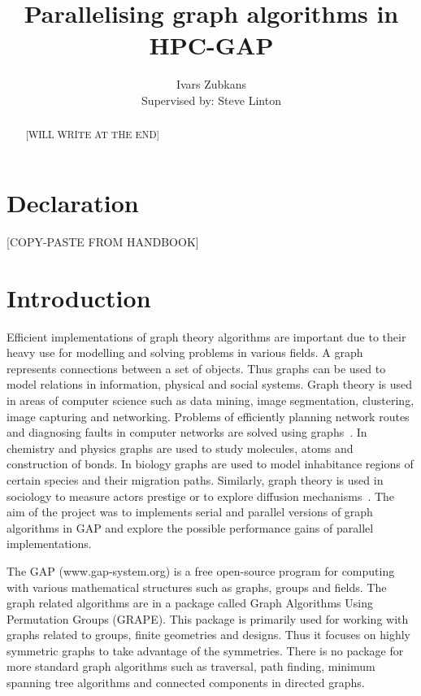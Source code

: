 \documentclass{report}
\title{Parallelising graph algorithms in HPC-GAP}
\author{Ivars Zubkans \\ \small Supervised by: Steve Linton}
\theoremstyle{plain}
\theoremstyle{definition}
\theoremstyle{remark}
\begin{document}
\maketitle

\begin{abstract}
[WILL WRITE AT THE END]
\end{abstract}

\chapter*{Declaration}
[COPY-PASTE FROM HANDBOOK]

\tableofcontents

\chapter{Introduction}

Efficient implementations of graph theory algorithms are important due to their heavy use for modelling and solving problems in various fields. A graph represents connections between a set of objects. Thus graphs can be used to model relations in information, physical and social systems. Graph theory is used in areas of computer science such as data mining, image segmentation, clustering, image capturing and networking. Problems of efficiently planning network routes and diagnosing faults in computer networks are solved using graphs~\cite{6005872}. In chemistry and physics graphs are used to study molecules, atoms and construction of bonds. In biology graphs are used to model inhabitance regions of certain species and their migration paths. Similarly, graph theory is used in sociology to measure actors prestige or to explore diffusion mechanisms~\cite{shirinivas2010applications}. The aim of the project was to implements serial and parallel versions of graph algorithms in GAP and explore the possible performance gains of parallel implementations.

The GAP (www.gap-system.org) is a free open-source program for computing with various mathematical structures such as graphs, groups and fields. The graph related algorithms are in a package called Graph Algorithms Using Permutation Groups (GRAPE). This package is primarily used for working with graphs related to groups, finite geometries and designs. Thus it focuses on highly symmetric graphs to take advantage of the symmetries. There is no package for more standard graph algorithms such as traversal, path finding, minimum spanning tree algorithms and connected components in directed graphs.
\end{document}
